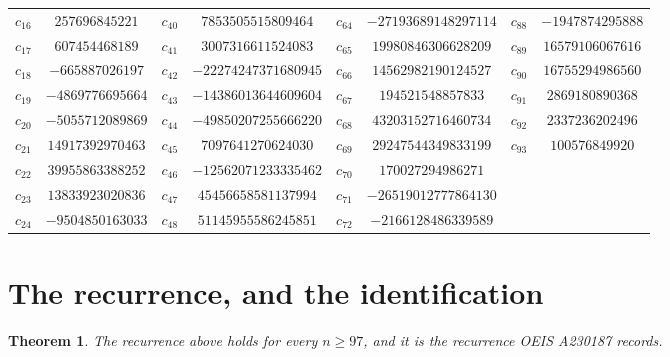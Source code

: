 \documentclass[11pt,a4paper]{article}
\theoremstyle{plain}
\newtheorem{theorem}{Theorem}
\theoremstyle{definition}
\begin{document}
\begin{center}
\begin{tabular}{cccccccc}
$c_{16}$ & $257696845221$ & $c_{40}$ & $7853505515809464$ & $c_{64}$ & $-27193689148297114$ & $c_{88}$ & $-1947874295888$ \\
$c_{17}$ & $607454468189$ & $c_{41}$ & $3007316611524083$ & $c_{65}$ & $19980846306628209$ & $c_{89}$ & $16579106067616$ \\
$c_{18}$ & $-665887026197$ & $c_{42}$ & $-22274247371680945$ & $c_{66}$ & $14562982190124527$ & $c_{90}$ & $16755294986560$ \\
$c_{19}$ & $-4869776695664$ & $c_{43}$ & $-14386013644609604$ & $c_{67}$ & $194521548857833$ & $c_{91}$ & $2869180890368$ \\
$c_{20}$ & $-5055712089869$ & $c_{44}$ & $-49850207255666220$ & $c_{68}$ & $43203152716460734$ & $c_{92}$ & $2337236202496$ \\
$c_{21}$ & $14917392970463$ & $c_{45}$ & $7097641270624030$ & $c_{69}$ & $29247544349833199$ & $c_{93}$ & $100576849920$ \\
$c_{22}$ & $39955863388252$ & $c_{46}$ & $-12562071233335462$ & $c_{70}$ & $170027294986271$ &  &  \\
$c_{23}$ & $13833923020836$ & $c_{47}$ & $45456658581137994$ & $c_{71}$ & $-26519012777864130$ &  &  \\
$c_{24}$ & $-9504850163033$ & $c_{48}$ & $51145955586245851$ & $c_{72}$ & $-2166128486339589$ &  &  \\
\end{tabular}
\end{center}

\section{The recurrence, and the identification}

\begin{theorem}
The recurrence above holds for every $n\ge97$, and it is the recurrence OEIS A230187 records.
\end{theorem}
\end{document}
